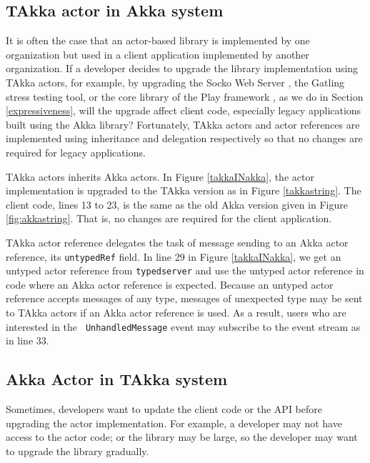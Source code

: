\subsection{TAkka actor in Akka system}

It is often the case that an actor-based library is implemented by one 
organization but used in a client application implemented by another 
organization.  If a developer decides to upgrade the library implementation 
using TAkka actors, for example, by upgrading the Socko Web Server 
\citep{SOCKO}, the Gatling \citep{Gatling} stress testing tool, or the core 
library of the Play framework \citep{play_doc}, as we do in Section 
\ref{expressiveness}, will the upgrade affect client code, especially 
legacy applications built using the Akka library?  Fortunately, TAkka actors and actor 
references are implemented using inheritance and delegation respectively so 
that no changes are required for legacy applications.

TAkka actors inherits Akka actors.  In Figure \ref{takkaINakka}, 
the actor implementation is upgraded to the TAkka version as in Figure 
\ref{takkastring}.  The client code, lines 13 to 23, is the same as the 
old Akka version given in Figure \ref{fig:akkastring}.  That is, no changes are 
required for the client application.

TAkka actor reference delegates the task of message sending to an 
Akka actor reference, its {\tt untypedRef} field.  In line 29 in Figure 
\ref{takkaINakka}, we get an untyped actor reference from {\tt typedserver} 
and 
use the untyped actor reference in code where an Akka actor reference is 
expected.  Because an untyped actor reference accepts messages of any type, 
messages of unexpected type may be sent to TAkka actors if an Akka actor 
reference is used.  As a result, users who are interested in the {\tt 
UnhandledMessage} event may subscribe to the event stream as in line 33.








\subsection{Akka Actor in TAkka system}

Sometimes, developers want to update the client code or the API before upgrading 
the actor implementation. For example, a developer may not have access to 
the actor code; or the library may be large, so the developer may want to 
upgrade the library gradually.

